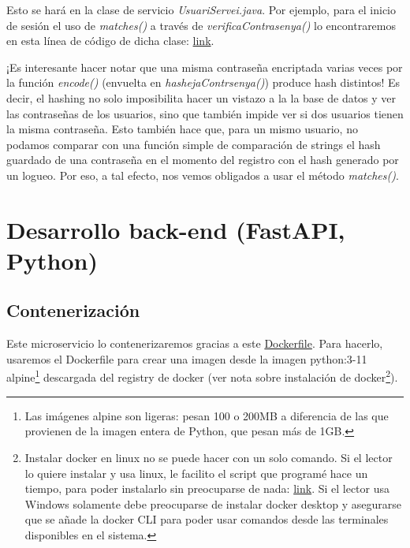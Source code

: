 \documentclass[a4paper,12pt]{report}
\begin{document}
			Esto se hará en la clase de servicio \textit{UsuariServei.java}. Por ejemplo, para el inicio de sesión el uso de \textit{matches()} a través de \textit{verificaContrasenya()} lo encontraremos en esta línea de código de dicha clase:  \href{https://github.com/blackcub3s/mercApp/blob/e8afa7110971dca00a660bd8ec5f1a565b852fbd/APP%20WEB/__springboot__produccio__/app/src/main/java/miApp/app/Usuaris/servei/UsuariServei.java#L67}{link}.
			

			
			
			¡Es interesante hacer notar que una misma contraseña encriptada varias veces por la función \textit{encode()} (envuelta en \textit{hashejaContrsenya()}) produce hash distintos! Es decir, el hashing no solo imposibilita hacer un vistazo a la la base de datos y ver las contraseñas de los usuarios, sino que también impide ver si dos usuarios tienen la misma contraseña. Esto también hace que, para un mismo usuario, no podamos comparar con una función simple de comparación de strings el hash guardado de una contraseña en el momento del registro con el hash generado por un logueo. Por eso, a tal efecto, nos vemos obligados a usar el método \textit{matches()}.
			
			
			
			
			

			
	\section{Desarrollo back-end (FastAPI, Python)}
	
	\subsection{Contenerización}
	\label{sec:conteneritzacioPython}
	
	Este microservicio lo contenerizaremos gracias a este \href{https://github.com/blackcub3s/mercApp/tree/main/APP%20WEB/__FastAPI__/Dockerfile}{Dockerfile}. Para hacerlo, usaremos el Dockerfile para crear una imagen desde la imagen python:3-11 alpine\footnote{Las imágenes alpine son ligeras: pesan 100 o 200MB a diferencia de las que provienen de la imagen entera de Python, que pesan más de 1GB.} descargada del registry de docker (ver nota sobre instalación de docker\footnote{ Instalar docker en linux no se puede hacer con un solo comando. Si el lector lo quiere instalar y usa linux, le facilito el script que programé hace un tiempo, para poder instalarlo sin preocuparse de nada: \href{https://github.com/blackcub3s/mercApp/blob/main/auxiliars/instalaDocker.sh}{link}. Si el lector usa Windows solamente debe preocuparse de instalar docker desktop y asegurarse que se añade la docker CLI para poder usar comandos desde las terminales disponibles en el sistema.}). 
	
\end{document}
